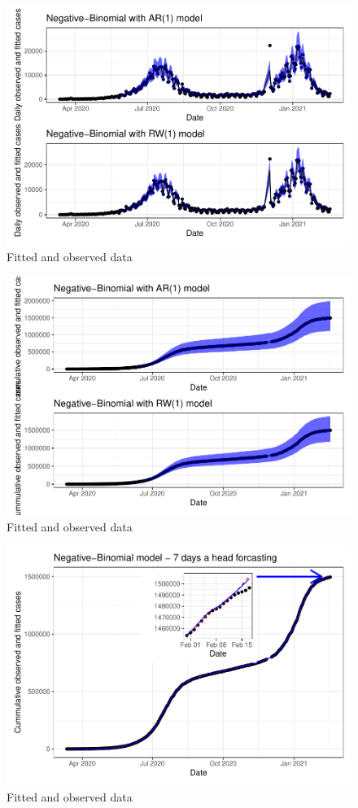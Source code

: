 \documentclass[10pt,letterpaper]{article}
\begin{document}
\begin{figure}
\includegraphics[width=0.9\linewidth]{COVIDincidenceSA_files/figure-latex/unnamed-chunk-6-1} \caption{Fitted and observed data}\label{fig:unnamed-chunk-6-1}
\end{figure}
\begin{figure}
\includegraphics[width=0.9\linewidth]{COVIDincidenceSA_files/figure-latex/unnamed-chunk-6-2} \caption{Fitted and observed data}\label{fig:unnamed-chunk-6-2}
\end{figure}

\begin{figure}
\includegraphics[width=0.9\linewidth]{COVIDincidenceSA_files/figure-latex/unnamed-chunk-8-1} \caption{Fitted and observed data}\label{fig:unnamed-chunk-8}
\end{figure}
\end{document}
